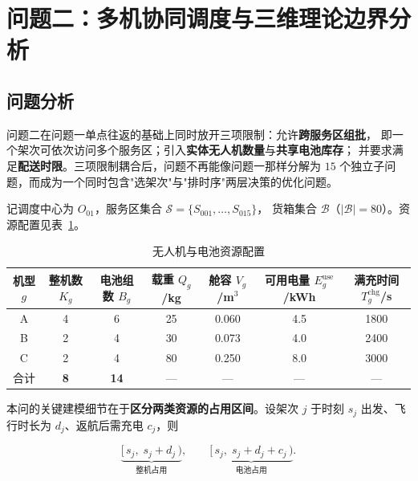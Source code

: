 
\section{问题二：多机协同调度与三维理论边界分析}

\subsection{问题分析}

问题二在问题一单点往返的基础上同时放开三项限制：允许\textbf{跨服务区组批}，
即一个架次可依次访问多个服务区；引入\textbf{实体无人机数量}与\textbf{共享电池库存}；
并要求满足\textbf{配送时限}。三项限制耦合后，问题不再能像问题一那样分解为
$15$ 个独立子问题，而成为一个同时包含"选架次"与"排时序"两层决策的优化问题。

记调度中心为 $O_{01}$，服务区集合 $\mathcal{S}=\{S_{001},\dots,S_{015}\}$，
货箱集合 $\mathcal{B}$（$|\mathcal{B}|=80$）。资源配置见表~\ref{tab:q2-res}。

\begin{table}[htbp]
  \centering
  \caption{无人机与电池资源配置}
  \label{tab:q2-res}
  \begin{tabular}{ccccccc}
    \toprule
    机型 $g$ & 整机数 $K_g$ & 电池组数 $B_g$ & 载重 $Q_g$/kg
      & 舱容 $V_g$/m$^3$ & 可用电量 $E_g^{\mathrm{use}}$/kWh
      & 满充时间 $T_g^{\mathrm{chg}}$/s \\
    \midrule
    A & 4 & 6 & 25 & 0.060 & 4.5 & 1800 \\
    B & 2 & 4 & 30 & 0.073 & 4.0 & 2400 \\
    C & 2 & 4 & 80 & 0.250 & 8.0 & 3000 \\
    \midrule
    合计 & \textbf{8} & \textbf{14} & --- & --- & --- & --- \\
    \bottomrule
  \end{tabular}
\end{table}

本问的关键建模细节在于\textbf{区分两类资源的占用区间}。设架次 $j$ 于时刻 $s_j$
出发、飞行时长为 $d_j$、返航后需充电 $c_j$，则

\begin{equation}
  \underbrace{[\,s_j,\;s_j+d_j\,)}_{\text{整机占用}},
  \qquad
  \underbrace{[\,s_j,\;s_j+d_j+c_j\,)}_{\text{电池占用}} .
\end{equation}

